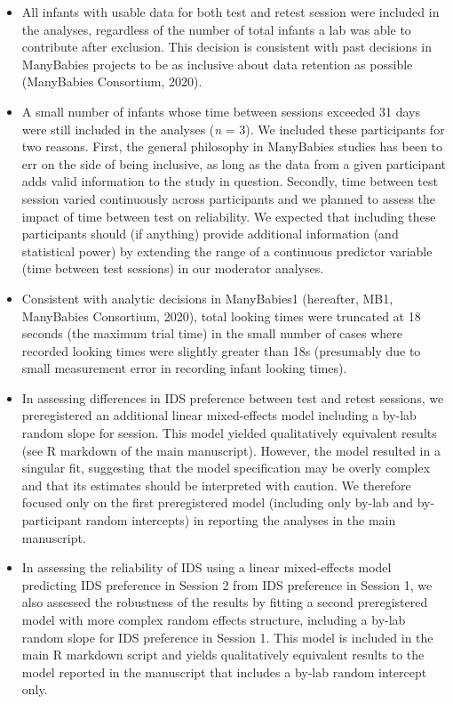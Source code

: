\documentclass[
  english,
  man, donotrepeattitle,floatsintext]{apa6}
\providecommand{\tightlist}{%
  \setlength{\itemsep}{0pt}\setlength{\parskip}{0pt}}
\begin{document}
\begin{itemize}
\tightlist
\item
  All infants with usable data for both test and retest session were included in the analyses, regardless of the number of total infants a lab was able to contribute after exclusion. This decision is consistent with past decisions in ManyBabies projects to be as inclusive about data retention as possible (ManyBabies Consortium, 2020).
\item
  A small number of infants whose time between sessions exceeded 31 days were still included in the analyses (\emph{n} = 3). We included these participants for two reasons. First, the general philosophy in ManyBabies studies has been to err on the side of being inclusive, as long as the data from a given participant adds valid information to the study in question. Secondly, time between test session varied continuously across participants and we planned to assess the impact of time between test on reliability. We expected that including these participants should (if anything) provide additional information (and statistical power) by extending the range of a continuous predictor variable (time between test sessions) in our moderator analyses.
\item
  Consistent with analytic decisions in ManyBabies1 (hereafter, MB1, ManyBabies Consortium, 2020), total looking times were truncated at 18 seconds (the maximum trial time) in the small number of cases where recorded looking times were slightly greater than 18s (presumably due to small measurement error in recording infant looking times).
\item
  In assessing differences in IDS preference between test and retest sessions, we preregistered an additional linear mixed-effects model including a by-lab random slope for session. This model yielded qualitatively equivalent results (see R markdown of the main manuscript). However, the model resulted in a singular fit, suggesting that the model specification may be overly complex and that its estimates should be interpreted with caution. We therefore focused only on the first preregistered model (including only by-lab and by-participant random intercepts) in reporting the analyses in the main manuscript.
\item
  In assessing the reliability of IDS using a linear mixed-effects model predicting IDS preference in Session 2 from IDS preference in Session 1, we also assessed the robustness of the results by fitting a second preregistered model with more complex random effects structure, including a by-lab random slope for IDS preference in Session 1. This model is included in the main R markdown script and yields qualitatively equivalent results to the model reported in the manuscript that includes a by-lab random intercept only.

\end{itemize}
\end{document}
